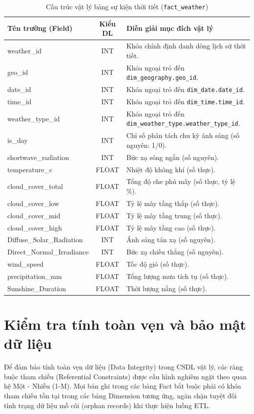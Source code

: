 \documentclass[12pt, a4paper]{report}
\begin{document}
\begin{table}[H]
\centering
\caption{Cấu trúc vật lý bảng sự kiện thời tiết (\texttt{fact\_weather})}
\label{tab:fact_weather_spec}
\renewcommand{\arraystretch}{1.4}
\begin{tabularx}{\textwidth}{p{5cm} c X}
\toprule
\textbf{Tên trường (Field)} & \textbf{Kiểu DL} & \textbf{Diễn giải mục đích vật lý} \\
\midrule
weather\_id & INT & Khóa chính định danh dòng lịch sử thời tiết. \\
geo\_id & INT & Khóa ngoại trỏ đến \texttt{dim\_geography.geo\_id}. \\
date\_id & INT & Khóa ngoại trỏ đến \texttt{dim\_date.date\_id}. \\
time\_id & INT & Khóa ngoại trỏ đến \texttt{dim\_time.time\_id}. \\
weather\_type\_id & INT & Khóa ngoại trỏ đến \texttt{dim\_weather\_type.weather\_type\_id}. \\
is\_day & INT & Chỉ số phân tách chu kỳ ánh sáng (số nguyên: 1/0). \\
shortwave\_radiation & INT & Bức xạ sóng ngắn (số nguyên). \\
temperature\_c & FLOAT & Nhiệt độ không khí (số thực). \\
cloud\_cover\_total & FLOAT & Tổng độ che phủ mây (số thực, tỷ lệ \%). \\
cloud\_cover\_low & FLOAT & Tỷ lệ mây tầng thấp (số thực). \\
cloud\_cover\_mid & FLOAT & Tỷ lệ mây tầng trung (số thực). \\
cloud\_cover\_high & FLOAT & Tỷ lệ mây tầng cao (số thực). \\
Diffuse\_Solar\_Radiation & INT & Ánh sáng tán xạ (số nguyên). \\
Direct\_Normal\_Irradiance & INT & Bức xạ chiếu thẳng (số nguyên). \\
wind\_speed & FLOAT & Tốc độ gió (số thực). \\
precipitation\_mm & FLOAT & Tổng lượng mưa tích tụ (số thực). \\
Sunshine\_Duration & FLOAT & Thời lượng nắng (số thực). \\
\bottomrule
\end{tabularx}
\end{table}

\section{Kiểm tra tính toàn vẹn và bảo mật dữ liệu}
\label{sec:data_integrity}
Để đảm bảo tính toàn vẹn dữ liệu (Data Integrity) trong CSDL vật lý, các ràng buộc tham chiếu (Referential Constraints) được cấu hình nghiêm ngặt theo quan hệ Một - Nhiều (1-M). Mọi bản ghi trong các bảng Fact bắt buộc phải có khóa tham chiếu tồn tại trong các bảng Dimension tương ứng, ngăn chặn tuyệt đối tình trạng dữ liệu mồ côi (orphan records) khi thực hiện luồng ETL.
\end{document}

